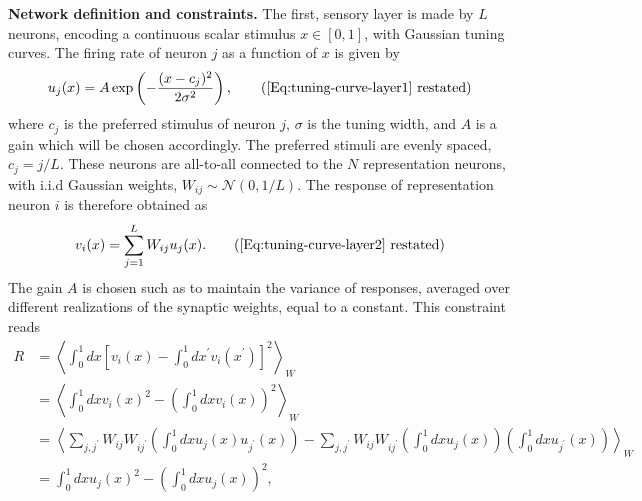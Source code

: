\documentclass[a4paper]{article}%
\begin{document}
\textbf{Network definition and constraints.} The first, sensory layer is made
by $L$ neurons, encoding a continuous scalar stimulus $x \in[0,1]$, with
Gaussian tuning curves.
The firing rate of neuron $j$ as a function of $x$ is given by
\begin{equation}
u_{j}(x) = A\exp\left(  -\frac{(x-c_{j})^{2}}{2\sigma^{2}}\right)  ,
\tag{\ref{Eq:tuning-curve-layer1} restated}%
\end{equation}
where $c_{j}$ is the preferred stimulus of neuron $j$, $\sigma$ is the tuning
width, and $A$ is a gain which will be chosen accordingly. The preferred
stimuli are evenly spaced, $c_{j}= j/L$. These neurons are all-to-all
connected to the $N$ representation neurons, with i.i.d Gaussian weights,
$W_{ij} \sim\mathcal{N}(0,1/L)$. The response of representation neuron $i$ is
therefore obtained as
\begin{equation}
v_{i}(x) = \sum_{j=1}^{L} W_{ij}u_{j}(x). \tag{\ref{Eq:tuning-curve-layer2}
restated}%
\end{equation}
The gain $A$ is chosen such as to maintain the variance of responses, averaged
over different realizations of the synaptic weights, equal to a constant. This
constraint reads
\begin{equation}%
\begin{split}
R  &  = \left\langle \int_{0}^{1} dx \left[  v_{i}\left(  x\right)  -\int%
_{0}^{1}dx^{\prime} v_{i}\left(  x^{\prime}\right)  \right]  ^{2}
\right\rangle _{W}\\
&  = \left\langle \int_{0}^{1} dx v_{i}(x)^{2} - \left(  \int_{0}^{1} dx
v_{i}(x)\right)  ^{2} \right\rangle _{W}\\
&  = \left\langle \sum_{j,j^{\prime}} W_{ij}W_{ij^{\prime}}\left(  \int%
_{0}^{1} dx u_{j}(x)u_{j^{\prime}}(x)\right)  - \sum_{j,j^{\prime}}
W_{ij}W_{ij^{\prime}}\left(  \int_{0}^{1} dx u_{j}(x)\right)  \left(  \int%
_{0}^{1} dx u_{j^{\prime}}(x)\right)  \right\rangle _{W}\\
&  = \int_{0}^{1} dx u_{j}\left(  x\right)  ^{2} - \left(  \int_{0}^{1} dx
u_{j}\left(  x\right)  \right)  ^{2} ,\label{Eq:resource-constraint-ext}%
\end{split}
\end{equation}
\end{document}
